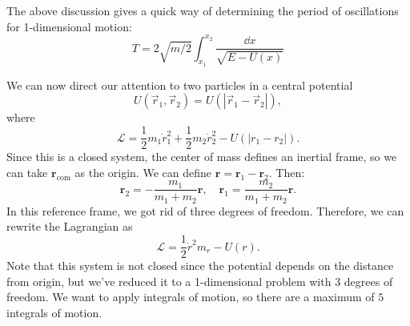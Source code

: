 \documentclass{article}
\numberwithin{equation}{section}
\begin{document}
The above discussion gives a quick way of determining the period of oscillations for 1-dimensional motion:
\begin{equation*}
    T = 2\sqrt{m/2}\int_{x_1}^{x_2}\frac{\dd{x}}{\sqrt{E-U(x)}}
\end{equation*}
\begin{example}
    We can now direct our attention to two particles in a central potential
    \begin{equation*}
        U(\vec{r}_1,\vec{r}_2) = U(|\vec{r}_1-\vec{r}_2|),
    \end{equation*}
    where 
    \begin{equation*}
        \mathcal{L} = \frac{1}{2}m_1\dot{r}_1^2 + \frac{1}{2}m_2\dot{r}_2^2 - U(|r_1-r_2|).
    \end{equation*}
    Since this is a closed system, the center of mass defines an inertial frame, so we can take $\bm{r}_\text{com}$ as the origin. We can define $\bm{r}=\bm{r}_1-\bm{r}_2.$ Then:
    \begin{equation*}
        \bm{r}_2 = -\frac{m_1}{m_1+m_2}\bm{r},\quad \bm{r}_1 = \frac{m_2}{m_1+m_2}\bm{r}.
    \end{equation*}
    In this reference frame, we got rid of three degrees of freedom. Therefore, we can rewrite the Lagrangian as
    \begin{equation*}
        \mathcal{L} = \frac{1}{2}\dot{r}^2m_r - U(r).
    \end{equation*}
    Note that this system is not closed since the potential depends on the distance from origin, but we've reduced it to a 1-dimensional problem with 3 degrees of freedom. We want to apply integrals of motion, so there are a maximum of $5$ integrals of motion.
\end{example}
\end{document}
